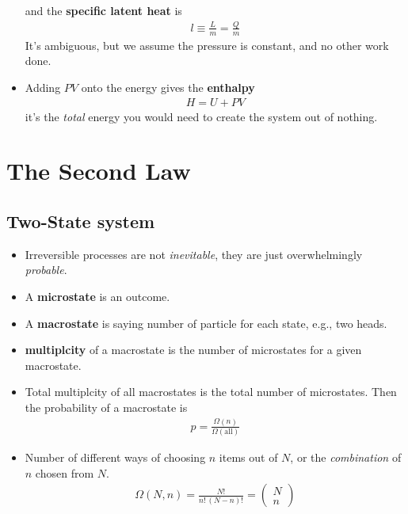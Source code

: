 \documentclass{book}
\begin{document}
\begin{itemize}
	      and the \textbf{specific latent heat} is
	      \begin{align}
		      \label{eq:specific latent}
		      l \equiv \frac{L}{m}= \frac{Q}{m}
	      \end{align}
	      It's ambiguous, but we assume the pressure is constant, and no other work done.
	\item Adding $PV$ onto the energy gives the \textbf{enthalpy}
	      \begin{align}
		      \label{eq:enthalpy}
		      H = U + PV
	      \end{align}
	      it's the \textit{total} energy you would need to create the system out of nothing.



\end{itemize}


\chapter{The Second Law}

\section{Two-State system}%
\label{sec:two state}
\begin{itemize}

	\item Irreversible processes are not \textit{inevitable}, they are just overwhelmingly \textit{probable}.
	\item A \textbf{microstate} is an outcome.
	\item A \textbf{macrostate} is saying number of particle for each state, e.g., two heads.
	\item \textbf{multiplcity} of a macrostate is the number of microstates for a given macrostate.
	\item Total multiplcity of all macrostates is the total number of microstates. Then the probability
	      of a macrostate is
	      \begin{align}
		      p = \frac{\Omega(n)}{\Omega(\text{all})}
	      \end{align}
	\item Number of different ways of choosing $n$ items out of $N$, or the \textit{combination} of $n$
	      chosen from $N$.
	      \begin{align}
		      \label{eq:multiplcity formula}
		      \Omega(N, n) = \frac{N!}{n! \, (N-n)!} =
		      \begin{pmatrix}
			      N \\ n
		      \end{pmatrix}
	      \end{align}
\end{itemize}
\end{document}
